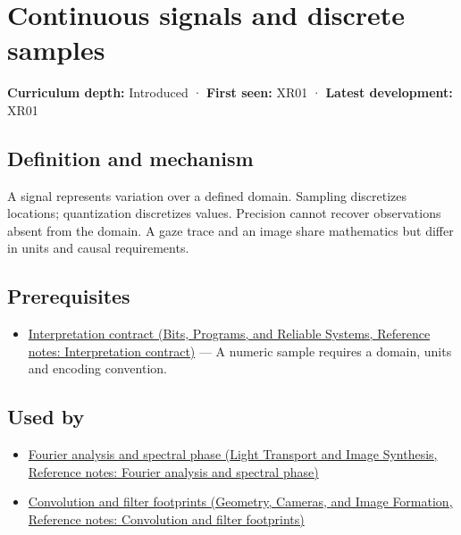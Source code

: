 \hypertarget{appendix-1077ea8fc737}{}\label{referencestart:appendix-1077ea8fc737}
\section{Continuous signals and discrete samples}\label{appendix-1077ea8fc737-continuous-signals-and-discrete-samples}

\textbf{Curriculum depth:} Introduced · \textbf{First seen:} XR01 · \textbf{Latest development:} XR01

\begin{allmightroledefinition}

\subsection{Definition and mechanism}\label{appendix-1077ea8fc737-definition-and-mechanism}

A signal represents variation over a defined domain. Sampling discretizes locations; quantization discretizes values. Precision cannot recover observations absent from the domain. A gaze trace and an image share mathematics but differ in units and causal requirements.

\end{allmightroledefinition}

\subsection{Prerequisites}\label{appendix-1077ea8fc737-prerequisites}

\begin{itemize}
\tightlist
\item
  \href{../01-Bits-Programs-and-Reliable-Systems/main.pdf\#nameddest=appendix-f414bd4ed05c}{Interpretation contract (Bits, Programs, and Reliable Systems, Reference notes: Interpretation contract)} --- A numeric sample requires a domain, units and encoding convention.
\end{itemize}

\subsection{Used by}\label{appendix-1077ea8fc737-used-by}

\begin{itemize}
\tightlist
\item
  \href{../04-Light-Transport-and-Image-Synthesis/main.pdf\#nameddest=appendix-b60686ba06a1}{Fourier analysis and spectral phase (Light Transport and Image Synthesis, Reference notes: Fourier analysis and spectral phase)}
\item
  \href{../03-Geometry-Cameras-and-Image-Formation/main.pdf\#nameddest=appendix-d5b3c692d9f0}{Convolution and filter footprints (Geometry, Cameras, and Image Formation, Reference notes: Convolution and filter footprints)}
\end{itemize}

